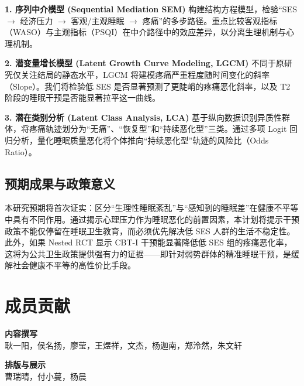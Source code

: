 \documentclass[lang=cn,a4paper,newtx,code=minted,codebg=light]{elegantpaper}
\begin{document}
\textbf{1. 序列中介模型 (Sequential Mediation SEM)}
构建结构方程模型，检验“SES $\rightarrow$ 经济压力 $\rightarrow$ 客观/主观睡眠 $\rightarrow$ 疼痛”的多步路径。重点比较客观指标（WASO）与主观指标（PSQI）在中介路径中的效应差异，以分离生理机制与心理机制。

\textbf{2. 潜变量增长模型 (Latent Growth Curve Modeling, LGCM)}
不同于原研究仅关注结局的静态水平，LGCM 将建模疼痛严重程度随时间变化的斜率（Slope）。我们将检验低 SES 是否显著预测了更陡峭的疼痛恶化斜率，以及 T2 阶段的睡眠干预是否能显著拉平这一曲线。

\textbf{3. 潜在类别分析 (Latent Class Analysis, LCA)}
基于纵向数据识别异质性群体，将疼痛轨迹划分为“无痛”、“恢复型”和“持续恶化型”三类。通过多项 Logit 回归分析，量化睡眠质量恶化将个体推向“持续恶化型”轨迹的风险比（Odds Ratio）。

\subsection{预期成果与政策意义}
本研究预期将首次证实：区分“生理性睡眠紊乱”与“感知到的睡眠差”在健康不平等中具有不同作用。通过揭示心理压力作为睡眠恶化的前置因素，本计划将提示干预政策不能仅停留在睡眠卫生教育，而必须优先解决低 SES 人群的生活不稳定性。此外，如果 Nested RCT 显示 CBT-I 干预能显著降低低 SES 组的疼痛恶化率，这将为公共卫生政策提供强有力的证据——即针对弱势群体的精准睡眠干预，是缓解社会健康不平等的高性价比手段。

\newpage

\vspace*{1.5em}

\section*{成员贡献}
\label{sec:contributions} 


\vspace{1.5em}

\noindent \textbf{\large 内容撰写} \\[0.8em] 
耿一阳，侯名扬，廖莹，王煜祥，文杰，杨迦南，郑泠然，朱文轩

\vspace{1.5em}

\noindent \textbf{\large 排版与展示} \\[0.8em] 
曹瑞晴，付小蔓，杨晨
\end{document}
